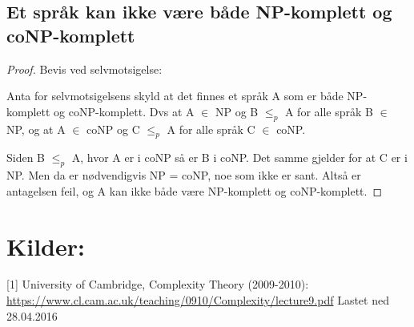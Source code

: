 \documentclass{article}
\begin{document}
\subsection*{Et språk kan ikke være både NP-komplett og coNP-komplett}
\begin{proof}
Bevis ved selvmotsigelse:

Anta for selvmotsigelsens skyld at det finnes et språk A som er både NP-komplett og coNP-komplett. Dvs at A $\in$ NP og  B $\leq_p$ A for alle språk B $\in$ NP,  og at A $\in$ coNP og C $\leq_p$ A for alle språk C $\in$ coNP.

Siden B $\leq_p$ A, hvor A er i coNP så er B i coNP. Det samme gjelder for at C er i NP. Men da er nødvendigvis NP = coNP, noe som ikke er sant. Altså er antagelsen feil, og A kan ikke både være NP-komplett og coNP-komplett.

\end{proof}


\section*{Kilder:}
[1] University of Cambridge, Complexity Theory (2009-2010): \\ \url{https://www.cl.cam.ac.uk/teaching/0910/Complexity/lecture9.pdf} Lastet ned 28.04.2016
\end{document}
